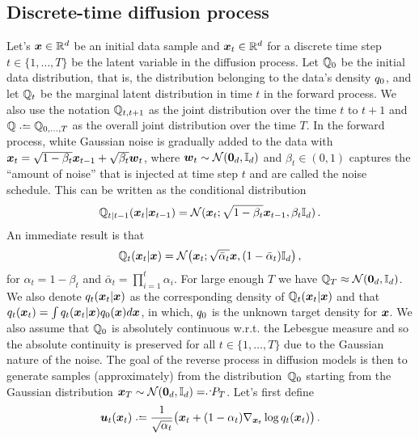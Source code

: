 \subsection{Discrete-time diffusion process}\label{sec:distime}
Let's  $\boldsymbol{x}\in \textcolor{black}{\mathbb{R}}^{\textcolor{black}{d}}$ be an initial data sample  and $\boldsymbol{x}_t\in \textcolor{black}{\mathbb{R}}^{\textcolor{black}{d}}$  for a  discrete time step $t\in\{1,\dots,T\}$  be the latent variable  in the diffusion process. 
Let $\mathbb{Q}_0$ be the initial data distribution, that is, the distribution belonging to the data's density $q_0$, and let $\mathbb{Q}_t$ be the marginal latent distribution in time $t$ in the forward process.
We also use the notation $\mathbb{Q}_{t,t+1} $ as the  joint distribution over the time $t$ to $t+1$ and $\Fd\deq \Fd_{0,\dots,T} $ as the overall joint distribution over the time $T$. 
In the forward process, white Gaussian noise is gradually added to the data with $\textcolor{black}{\boldsymbol{x}}_t=\sqrt{1-\beta_t} \textcolor{black}{\boldsymbol{x}}_{t-1}+\sqrt{\beta_t}\boldsymbol{w}_t$, where $\boldsymbol{w}_t\sim \mathcal{N}(\boldsymbol{0}_{\textcolor{black}{d}},\textcolor{black}{\mathbb{I}_{\textcolor{black}{d}}})$ and  $\beta_t\in (0,1)$ captures the ``amount of noise'' that is injected at time step $t$ and are called the noise schedule. 
This can be written as the conditional distribution 
\begin{equation*}\label{eq:forwardP}
    \mathbb{Q}_{t|t-1}(\textcolor{black}{\boldsymbol{x}}_t|\textcolor{black}{\boldsymbol{x}}_{t-1})=\mathcal{N}(\textcolor{black}{\boldsymbol{x}}_t;\sqrt{1-\beta_t}\textcolor{black}{\boldsymbol{x}}_{t-1},\beta_t\textcolor{black}{\mathbb{I}_{\textcolor{black}{d}}})\,.
\end{equation*}
An immediate result is that
\begin{equation*}
    \mathbb{Q}_{t}(\textcolor{black}{\boldsymbol{x}}_t|\textcolor{black}{\boldsymbol{x}})=\mathcal{N}\bigr(\textcolor{black}{\boldsymbol{x}}_t;\sqrt{\bar\alpha_t}\textcolor{black}{\boldsymbol{x}},(1-\bar\alpha_t)\textcolor{black}{\mathbb{I}_{\textcolor{black}{d}}}\bigl)\,,
\end{equation*}
for $\alpha_t=1-\beta_t$ and $\bar\alpha_t=\prod_{i=1}^{t} \alpha_i$. 
For large enough $T$   we have $\mathbb{Q}_T\approx \mathcal{N}(\boldsymbol{0}_{\textcolor{black}{d}},\textcolor{black}{\mathbb{I}_{\textcolor{black}{d}}})$.
We also denote $q_t(\textcolor{black}{\boldsymbol{x}}_t|\textcolor{black}{\boldsymbol{x}})$ as the corresponding density of $\mathbb{Q}_t(\textcolor{black}{\boldsymbol{x}}_t|\textcolor{black}{\boldsymbol{x}})$ and that 
$q_t(\textcolor{black}{\boldsymbol{x}}_t)=\int q_t(\textcolor{black}{\boldsymbol{x}}_t|\textcolor{black}{\boldsymbol{x}})q_{0}(\textcolor{black}{\boldsymbol{x}})d\textcolor{black}{\boldsymbol{x}}$, in which, $q_0$ is the unknown target density for $\textcolor{black}{\boldsymbol{x}}$.
We also assume that $\mathbb{Q}_0$ is absolutely continuous w.r.t. the Lebesgue measure and so the absolute continuity is preserved for all 
$t\in \{1,\dots,T\}$ due to the Gaussian nature of the noise. 
The goal of the reverse process in diffusion models is then  to generate samples (approximately) from the distribution~$\mathbb{Q}_0$
starting from the Gaussian distribution $\x_T\sim \mathcal{N}(\zerov,\Identity)\eqd\Bd_T$. 
Let's first define 
\begin{equation*}
    \ut(\x_t)\deq\frac{1}{\sqrt{\alpha_t}}\bigl(\x_t+(1-\alpha_t)\nabla_{\x_t}\log \Fdd_t(\x_t)\bigr)\,.
\end{equation*}
